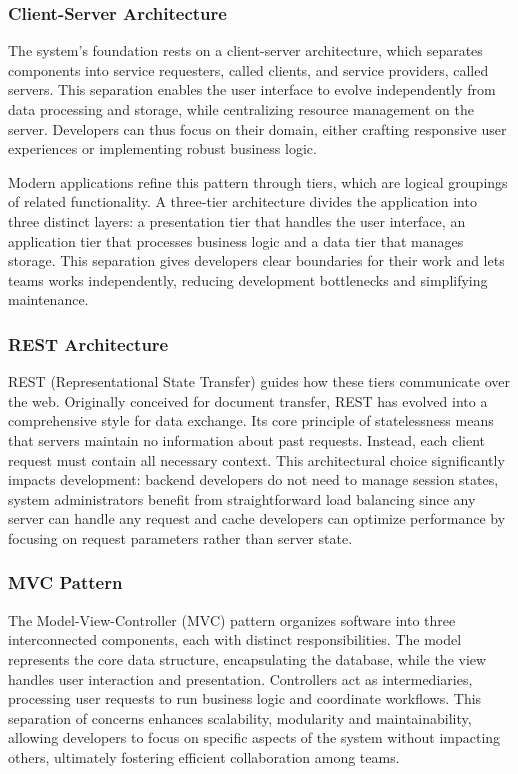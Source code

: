 \subsubsection{Client-Server Architecture}
The system's foundation rests on a client-server architecture, which separates components into service requesters, called clients, and service providers, called servers.
This separation enables the user interface to evolve independently from data processing and storage, while centralizing resource management on the server.
Developers can thus focus on their domain, either crafting responsive user experiences or implementing robust business logic.

Modern applications refine this pattern through tiers, which are logical groupings of related functionality.
A three-tier architecture divides the application into three distinct layers: a presentation tier that handles the user interface, an application tier that processes business logic and a data tier that manages storage.
This separation gives developers clear boundaries for their work and lets teams works independently, reducing development bottlenecks and simplifying maintenance.

\subsubsection{REST Architecture}
REST (Representational State Transfer) guides how these tiers communicate over the web.
Originally conceived for document transfer, REST has evolved into a comprehensive style for data exchange.
Its core principle of statelessness means that servers maintain no information about past requests.
Instead, each client request must contain all necessary context.
This architectural choice significantly impacts development: backend developers do not need to manage session states, system administrators benefit from straightforward load balancing since any server can handle any request and cache developers can optimize performance by focusing on request parameters rather than server state.

\subsubsection{MVC Pattern}
The Model-View-Controller (MVC) pattern organizes software into three interconnected components, each with distinct responsibilities.
The model represents the core data structure, encapsulating the database, while the view handles user interaction and presentation.
Controllers act as intermediaries, processing user requests to run business logic and coordinate workflows.
This separation of concerns enhances scalability, modularity and maintainability, allowing developers to focus on specific aspects of the system without impacting others, ultimately fostering efficient collaboration among teams.

